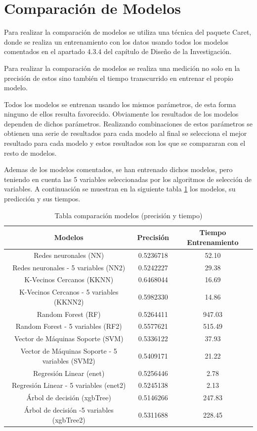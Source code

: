 \begin{subappendices}
	\label{appendix:B}
\section{Comparación de Modelos}

Para realizar la comparación de modelos se utiliza una técnica del paquete Caret, donde se realiza un entrenamiento con los datos usando todos los modelos comentados en el apartado 4.3.4 del capítulo de Diseño de la Investigación. 

Para realizar la comparación de modelos se realiza una medición no solo en la precisión de estos sino también el tiempo transcurrido en entrenar el propio modelo.

Todos los modelos se entrenan usando los mismos parámetros, de esta forma ninguno de ellos resulta favorecido. Obviamente los resultados de los modelos dependen de dichos parámetros. Realizando combinaciones de estos parámetros se obtienen una serie de resultados para cada modelo al final se selecciona el mejor resultado para cada modelo y estos resultados son los que se compararan con el resto de modelos.

Ademas de los modelos comentados, se han entrenado dichos modelos, pero teniendo en cuenta las 5 variables seleccionadas por los algoritmos de selección de variables. A continuación se muestran en la siguiente tabla \ref{tab:ComparacionModelos} los modelos, su predicción y sus tiempos.

\begin{table}[!ht]
	\caption{Tabla comparación modelos (precisión y tiempo)}
	\label{tab:ComparacionModelos}
	\centering
	\begin{tabular}{|c|c|c|}
		\hline 
		Modelos & Precisión & Tiempo Entrenamiento \\ 
		\hline 
		Redes neuronales (NN) & 0.5236718 & 52.10 \\ 
		\hline 
		Redes neuronales - 5 variables (NN2) & 0.5242227 & 29.38 \\ 
		\hline 
		K-Vecinos Cercanos (KKNN) & 0.6468044 & 16.69 \\ 
		\hline 
		K-Vecinos Cercanos - 5 variables (KKNN2) & 0.5982330 & 14.86 \\ 
		\hline 
		Random Forest (RF) & 0.5264411 & 947.03 \\ 
		\hline 
		Random Forest - 5 variables (RF2) & 0.5577621 & 515.49 \\ 
		\hline 
		Vector de Máquinas Soporte (SVM) & 0.5336122 & 37.93 \\ 
		\hline 
		Vector de Máquinas Soporte - 5 variables (SVM2) & 0.5409171 & 21.22 \\ 
		\hline 
		Regresión Linear (enet) & 0.5256446 & 2.78 \\ 
		\hline 
		Regresión Linear - 5 variables (enet2) & 0.5245138 & 2.13 \\ 
		\hline 
		Árbol de decisión (xgbTree) & 0.5146266 & 247.83 \\ 
		\hline 
		Árbol de decisión -5 variables (xgbTree2) & 0.5311688 & 228.45 \\ 
		\hline 
	\end{tabular} 
\end{table}
\FloatBarrier


\end{subappendices}
